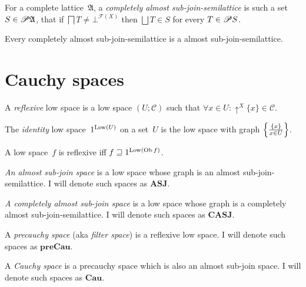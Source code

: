 \begin{defn}
For a complete lattice~$\mathfrak{A}$, a \emph{completely almost sub-join-semilattice} is such a set~$S\in\mathscr{P}\mathfrak{A}$, that
if $\bigsqcap T \neq \bot^{\mathscr{F}(X)}$ then $\bigsqcup T\in S$ for every $T\in\mathscr{P} S$.
\end{defn}

\begin{obvious}
Every completely almost sub-join-semilattice is a almost sub-join-semilattice.
\end{obvious}

\section{Cauchy spaces}

\begin{defn}
A \emph{reflexive} low space is a low space $( U ; \mathscr{C})$ such that
$\forall x \in U : \uparrow^X \{ x \} \in \mathscr{C}$.
\end{defn}

\begin{defn}
The \emph{identity} low space~$1^{\operatorname{Low}(U)}$ on a set~$U$ is the low space with graph $\left\{ \frac{\{x\}}{x\in U}\right\}$.
\end{defn}

\begin{obvious}\label{cs-refl-by-id}
A low space~$f$ is reflexive iff $f\sqsupseteq 1^{\operatorname{Low}(\operatorname{Ob} f)}$.
\end{obvious}

\begin{defn}
\emph{An almost sub-join space} is a low space whose graph is an almost sub-join-semilattice.
I will denote such spaces as $\mathbf{ASJ}$.
\end{defn}

\begin{defn}
\emph{A completely almost sub-join space} is a low space whose graph is a completely almost sub-join-semilattice.
I will denote such spaces as $\mathbf{CASJ}$.
\end{defn}

\begin{defn}
A \emph{precauchy space} (aka \emph{filter space}) is a reflexive low space.
I will denote such spaces as $\mathbf{preCau}$.
\end{defn}

\begin{defn}
A \emph{Cauchy space} is a precauchy space which is also an almost sub-join space.
I will denote such spaces as $\mathbf{Cau}$.
\end{defn}

